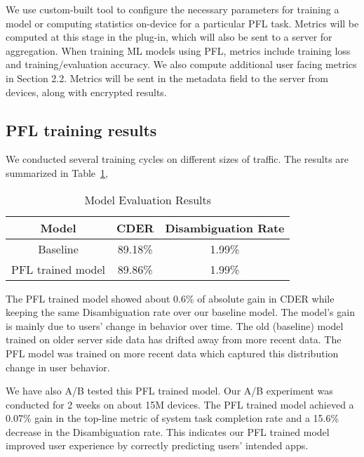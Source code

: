 We use custom-built tool to configure the necessary parameters for training a model or computing statistics on-device for a particular PFL task. Metrics will be computed at this stage in the plug-in, which will also be sent to a server for aggregation. When training ML models using PFL, metrics include training loss and training/evaluation accuracy. We also compute additional user facing metrics in Section 2.2. Metrics will be sent in the metadata field to the server from devices, along with encrypted results. 

\subsection{PFL training results}

We conducted several training cycles on different sizes of traffic. The results are summarized in Table~\ref{Result},

\begin{table}
\centering
\begin{tabular}{c|cc}
Model&CDER&Disambiguation Rate\\\hline
Baseline&89.18\%&1.99\%\\
PFL trained model&89.86\%&1.99\%\end{tabular}
\caption{\label{Result}Model Evaluation Results}
\end{table}
The PFL trained model showed about 0.6\% of absolute gain in CDER while keeping the same Disambiguation rate over our baseline model. The model’s gain is mainly due to users' change in behavior over time. The old (baseline) model trained on older server side data has drifted away from more recent data. The PFL model was trained on more recent data which captured this distribution change in user behavior.

We have also A/B tested this PFL trained model. Our A/B experiment was conducted for 2 weeks on about 15M devices. The PFL trained model achieved a 0.07\% gain in the top-line metric of system task completion rate and a 15.6\% decrease in the Disambiguation rate. This indicates our PFL trained model improved user experience by correctly predicting users' intended apps.



